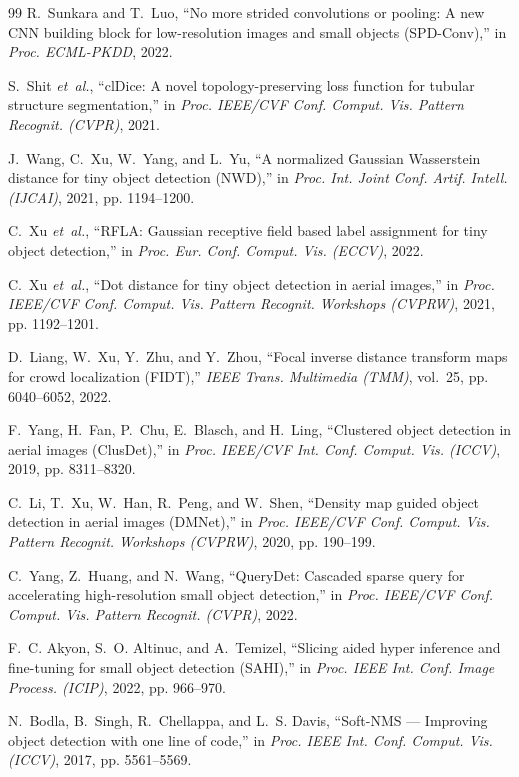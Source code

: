\documentclass[11pt,a4paper]{article}
\begin{document}
\begin{thebibliography}{99}
R.~Sunkara and T.~Luo, ``No more strided convolutions or pooling: A new CNN building block for low-resolution images and small objects (SPD-Conv),'' in \emph{Proc. ECML-PKDD}, 2022.

S.~Shit \emph{et~al.}, ``clDice: A novel topology-preserving loss function for tubular structure segmentation,'' in \emph{Proc. IEEE/CVF Conf. Comput. Vis. Pattern Recognit. (CVPR)}, 2021.

J.~Wang, C.~Xu, W.~Yang, and L.~Yu, ``A normalized Gaussian Wasserstein distance for tiny object detection (NWD),'' in \emph{Proc. Int. Joint Conf. Artif. Intell. (IJCAI)}, 2021, pp. 1194--1200.

C.~Xu \emph{et~al.}, ``RFLA: Gaussian receptive field based label assignment for tiny object detection,'' in \emph{Proc. Eur. Conf. Comput. Vis. (ECCV)}, 2022.

C.~Xu \emph{et~al.}, ``Dot distance for tiny object detection in aerial images,'' in \emph{Proc. IEEE/CVF Conf. Comput. Vis. Pattern Recognit. Workshops (CVPRW)}, 2021, pp. 1192--1201.

D.~Liang, W.~Xu, Y.~Zhu, and Y.~Zhou, ``Focal inverse distance transform maps for crowd localization (FIDT),'' \emph{IEEE Trans. Multimedia (TMM)}, vol.~25, pp. 6040--6052, 2022.

F.~Yang, H.~Fan, P.~Chu, E.~Blasch, and H.~Ling, ``Clustered object detection in aerial images (ClusDet),'' in \emph{Proc. IEEE/CVF Int. Conf. Comput. Vis. (ICCV)}, 2019, pp. 8311--8320.

C.~Li, T.~Xu, W.~Han, R.~Peng, and W.~Shen, ``Density map guided object detection in aerial images (DMNet),'' in \emph{Proc. IEEE/CVF Conf. Comput. Vis. Pattern Recognit. Workshops (CVPRW)}, 2020, pp. 190--199.

C.~Yang, Z.~Huang, and N.~Wang, ``QueryDet: Cascaded sparse query for accelerating high-resolution small object detection,'' in \emph{Proc. IEEE/CVF Conf. Comput. Vis. Pattern Recognit. (CVPR)}, 2022.

F.~C. Akyon, S.~O. Altinuc, and A.~Temizel, ``Slicing aided hyper inference and fine-tuning for small object detection (SAHI),'' in \emph{Proc. IEEE Int. Conf. Image Process. (ICIP)}, 2022, pp. 966--970.

N.~Bodla, B.~Singh, R.~Chellappa, and L.~S. Davis, ``Soft-NMS --- Improving object detection with one line of code,'' in \emph{Proc. IEEE Int. Conf. Comput. Vis. (ICCV)}, 2017, pp. 5561--5569.


\end{thebibliography}
\end{document}
